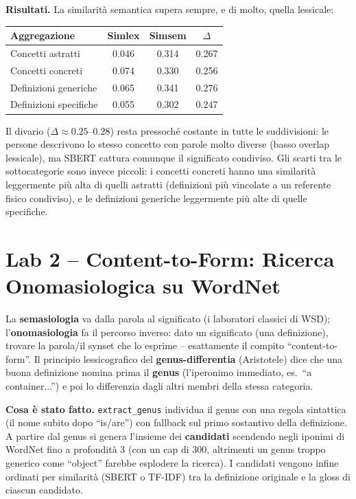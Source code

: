 \documentclass[11pt,a4paper]{article}
\begin{document}
\textbf{Risultati.} La similarità semantica supera sempre, e di molto, quella lessicale:

\begin{center}
\small
\begin{tabular}{lccc}
\toprule
\textbf{Aggregazione} & \textbf{Simlex} & \textbf{Simsem} & \textbf{$\Delta$} \\
\midrule
Concetti astratti  & 0.046 & 0.314 & 0.267 \\
Concetti concreti  & 0.074 & 0.330 & 0.256 \\
Definizioni generiche  & 0.065 & 0.341 & 0.276 \\
Definizioni specifiche & 0.055 & 0.302 & 0.247 \\
\bottomrule
\end{tabular}
\end{center}

Il divario ($\Delta\approx0.25$--$0.28$) resta pressoché costante in tutte le suddivisioni: le persone descrivono lo stesso concetto con parole molto diverse (basso overlap lessicale), ma SBERT cattura comunque il significato condiviso. Gli scarti tra le sottocategorie sono invece piccoli: i concetti concreti hanno una similarità leggermente più alta di quelli astratti (definizioni più vincolate a un referente fisico condiviso), e le definizioni generiche leggermente più alte di quelle specifiche.

\section{Lab 2 -- Content-to-Form: Ricerca Onomasiologica su WordNet}

\begin{theorybox}
La \textbf{semasiologia} va dalla parola al significato (i laboratori classici di WSD); l'\textbf{onomasiologia} fa il percorso inverso: dato un significato (una definizione), trovare la parola/il synset che lo esprime -- esattamente il compito ``content-to-form''. Il principio lessicografico del \textbf{genus-differentia} (Aristotele) dice che una buona definizione nomina prima il \textbf{genus} (l'iperonimo immediato, es.\ ``a container...'') e poi lo differenzia dagli altri membri della stessa categoria.
\end{theorybox}

\textbf{Cosa è stato fatto.} \texttt{extract\_genus} individua il genus con una regola sintattica (il nome subito dopo ``is/are'') con fallback sul primo sostantivo della definizione. A partire dal genus si genera l'insieme dei \textbf{candidati} scendendo negli iponimi di WordNet fino a profondità 3 (con un cap di 300, altrimenti un genus troppo generico come ``object'' farebbe esplodere la ricerca). I candidati vengono infine ordinati per similarità (SBERT o TF-IDF) tra la definizione originale e la gloss di ciascun candidato.
\end{document}
